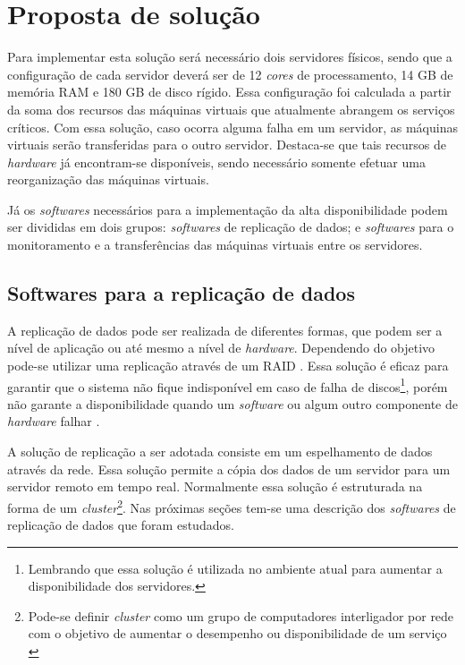 \section{Proposta de solução}
\label{section:propostasolucao}

Para implementar esta solução será necessário dois servidores físicos, sendo que a configuração de cada servidor deverá ser de 
12 \textit{cores} de processamento, 14 GB de memória \ac{RAM} e 180 GB de disco rígido. Essa configuração foi calculada a partir da soma dos 
recursos das máquinas virtuais que atualmente abrangem os serviços críticos. Com essa solução, caso ocorra alguma falha em um servidor, as 
máquinas virtuais serão transferidas para o outro servidor. Destaca-se que tais recursos de \textit{hardware} já encontram-se disponíveis, 
sendo necessário somente efetuar uma reorganização das máquinas virtuais.

Já os \textit{softwares} necessários para a implementação da alta disponibilidade podem ser divididas em dois grupos: \textit{softwares} de 
replicação de dados; e \textit{softwares} para o monitoramento e a transferências das máquinas virtuais entre os servidores.

\subsection{Softwares para a replicação de dados}
\label{section:toolrepl}

A replicação de dados pode ser realizada de diferentes formas, que podem ser a nível de aplicação ou até mesmo a nível de \textit{hardware}.
Dependendo do objetivo pode-se utilizar uma replicação através de um \ac{RAID} \cite{tanenbaum2009sistemas}. Essa solução é eficaz para garantir 
que o sistema não fique indisponível em caso de falha de discos\footnote[1]{Lembrando que essa solução é utilizada no ambiente atual para 
aumentar a disponibilidade dos servidores.}, porém não garante a disponibilidade quando um \textit{software} ou algum outro componente de 
\textit{hardware} falhar \cite{zaminhani2008}.

A solução de replicação a ser adotada consiste em um espelhamento de dados através da rede. Essa solução permite a cópia dos dados de um servidor
para um servidor remoto em tempo real. Normalmente essa solução é estruturada na forma de um \textit{cluster}\footnote[2]{Pode-se definir 
\textit{cluster} como um grupo de computadores interligador por rede com o objetivo de aumentar o desempenho ou disponibilidade de um serviço 
\cite{freitas2005}}.
Nas próximas seções tem-se uma descrição dos \textit{softwares} de replicação de dados que foram estudados.


